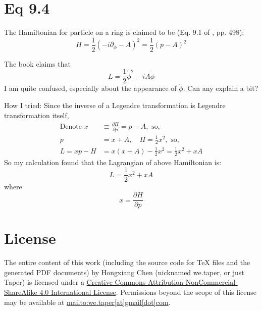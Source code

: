 \documentclass{article}
\begin{document}
\section{Eq 9.4}

The Hamiltonian for particle on a ring is claimed to be (Eq. 9.1 of
\cite{Altland2010}, pp. 498):
\begin{equation}
    H = \frac{1}{2}(-i\partial_\phi -A)^2 = \frac{1}{2}(p-A)^2
\end{equation}

The book \cite{Altland2010} claims that 
\begin{equation}
    L = \frac{1}{2}\dot{\phi}^2 - iA \dot{\phi}
\end{equation}
I am quite confused, especially about the appearance of $\dot{\phi}$. Can any explain
a bit?

How I tried: Since the inverse of a Legendre transformation is Legendre
transformation itself, 
\begin{align}
    \text{Denote }x &\equiv \frac{\partial H}{\partial p} = p-A,\text{ so,} \\
    p &= x + A,\quad H = \frac{1}{2}x^2 ,\text{ so,}\\
    L = x p - H &= x(x+A) - \frac{1}{2}x^2 = \frac{1}{2}x^2 + x A 
\end{align}
So my calculation found that the Lagrangian of above Hamiltonian is:
\begin{equation}
    L = \frac{1}{2}x^2 + x A
\end{equation}
where
\begin{equation}
    x = \frac{\partial H}{\partial p}
\end{equation}


{}


\printnomenclature
\section{License}
The entire content of this work (including the source code
for TeX files and the generated PDF documents) by 
Hongxiang Chen (nicknamed we.taper, or just Taper) is
licensed under a 
\href{http://creativecommons.org/licenses/by-nc-sa/4.0/}{Creative 
Commons Attribution-NonCommercial-ShareAlike 4.0 International 
License}. Permissions beyond the scope of this 
license may be available at \url{mailto:we.taper[at]gmail[dot]com}.
\end{document}
